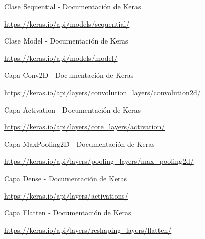 \documentclass[12pt, spanish]{article}
\begin{document}
\begin{thebibliography}{9}

	Clase Sequential - Documentación de Keras

	\url{https://keras.io/api/models/sequential/}



	Clase Model - Documentación de Keras

	\url{https://keras.io/api/models/model/}


	Capa Conv2D - Documentación de Keras

	\url{https://keras.io/api/layers/convolution_layers/convolution2d/}



	Capa Activation - Documentación de Keras

	\url{https://keras.io/api/layers/core_layers/activation/}


	Capa MaxPooling2D - Documentación de Keras

	\url{https://keras.io/api/layers/pooling_layers/max_pooling2d/}


	Capa Dense - Documentación de Keras

	\url{https://keras.io/api/layers/activations/}


	Capa Flatten - Documentación de Keras

	\url{https://keras.io/api/layers/reshaping_layers/flatten/}

\end{thebibliography}
\end{document}
